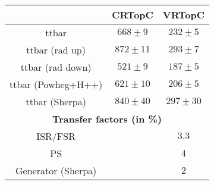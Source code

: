  \begin{table}[!h]
    \begin{center} \footnotesize
    
        \begin{tabular}{|c|c|c|}
	\noalign{\smallskip}\noalign{\smallskip}\hline
        & CRTopC & VRTopC\\
        \hline
ttbar&   $668\pm 9 $&         $232\pm 5 $\\
ttbar (rad up)&          $872\pm 11 $&         $293\pm 7 $\\
ttbar (rad down)&        $521\pm 9 $&   $187\pm 5 $\\
ttbar (Powheg+H++)&      $621\pm 10 $&         $206\pm 5 $\\
ttbar (Sherpa)&          $840\pm 40 $&        $297\pm 30 $\\        
        \hline
        \multicolumn{3}{c}{\bf Transfer factors (in \%)} \\ \hline
        ISR/FSR &  &    $3.3$\\
        PS &     &   $4$\\
        Generator (Sherpa) &    &          $2$\\
        \hline       
        \end{tabular}
    

\end{center}
\end{table}

